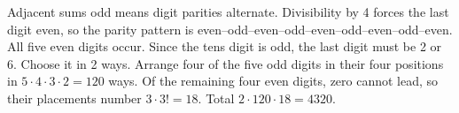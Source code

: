 Adjacent sums odd means digit parities alternate. Divisibility by 4 forces the last digit even, so the parity pattern is even--odd--even--odd--even--odd--even--odd--even. All five even digits occur. Since the tens digit is odd, the last digit must be 2 or 6. Choose it in 2 ways. Arrange four of the five odd digits in their four positions in $5\cdot4\cdot3\cdot2=120$ ways. Of the remaining four even digits, zero cannot lead, so their placements number $3\cdot3!=18$. Total $2\cdot120\cdot18=\boxed{4320}$.
